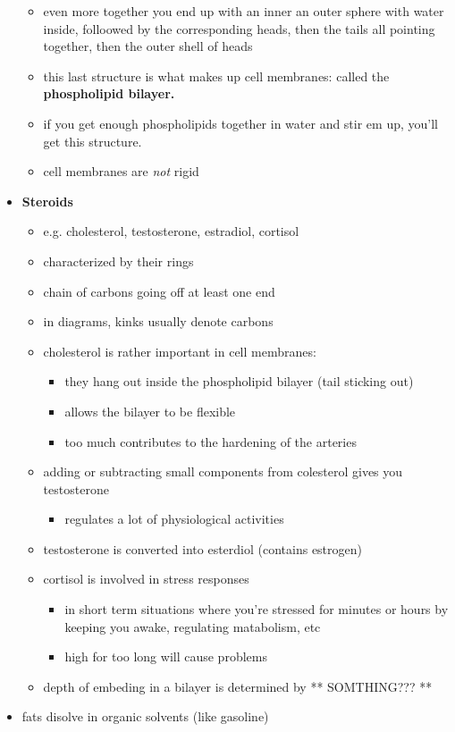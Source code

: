 \documentclass{article}
\theoremstyle{definition}
\begin{document}
\begin{itemize}
\begin{itemize}
			\item even more together you end up with an inner an outer sphere with water inside, folloowed by the corresponding heads, then the tails all pointing together, then the outer shell of heads
			\item this last structure is what makes up cell membranes: called the \textbf{phospholipid bilayer.} 
			\item if you get enough phospholipids together in water and stir em up, you'll get this structure.
			\item cell membranes are \textit{not} rigid
		\end{itemize}
	\item \textbf{Steroids}
		\begin{itemize}
			\item e.g. cholesterol, testosterone, estradiol, cortisol
			\item characterized by their rings
			\item chain of carbons going off at least one end
			\item in diagrams, kinks usually denote carbons
			\item cholesterol is rather important in cell membranes:
				\begin{itemize}
					\item they hang out inside the phospholipid bilayer (tail sticking out)
					\item allows the bilayer to be flexible
					\item too much contributes to the hardening of the arteries
				\end{itemize}
			\item adding or subtracting small components from colesterol gives you testosterone
				\begin{itemize}
					\item regulates a lot of physiological activities
				\end{itemize}
			\item testosterone is converted into esterdiol (contains estrogen)
			\item cortisol is involved in stress responses
				\begin{itemize}
					\item in short term situations where you're stressed for minutes or hours by keeping you awake, regulating matabolism, etc
					\item high for too long will cause problems
				\end{itemize}
			\item depth of embeding in a bilayer is determined by ** SOMTHING??? **
		\end{itemize}
	\item fats disolve in organic solvents (like gasoline)
\end{itemize}
\end{document}

